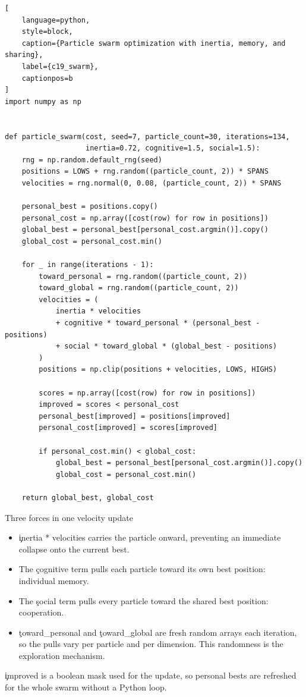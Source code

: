 \begin{lstlisting}[
    language=python,
    style=block,
    caption={Particle swarm optimization with inertia, memory, and sharing},
    label={c19_swarm},
    captionpos=b
]
import numpy as np


def particle_swarm(cost, seed=7, particle_count=30, iterations=134,
                   inertia=0.72, cognitive=1.5, social=1.5):
    rng = np.random.default_rng(seed)
    positions = LOWS + rng.random((particle_count, 2)) * SPANS
    velocities = rng.normal(0, 0.08, (particle_count, 2)) * SPANS

    personal_best = positions.copy()
    personal_cost = np.array([cost(row) for row in positions])
    global_best = personal_best[personal_cost.argmin()].copy()
    global_cost = personal_cost.min()

    for _ in range(iterations - 1):
        toward_personal = rng.random((particle_count, 2))
        toward_global = rng.random((particle_count, 2))
        velocities = (
            inertia * velocities
            + cognitive * toward_personal * (personal_best - positions)
            + social * toward_global * (global_best - positions)
        )
        positions = np.clip(positions + velocities, LOWS, HIGHS)

        scores = np.array([cost(row) for row in positions])
        improved = scores < personal_cost
        personal_best[improved] = positions[improved]
        personal_cost[improved] = scores[improved]

        if personal_cost.min() < global_cost:
            global_best = personal_best[personal_cost.argmin()].copy()
            global_cost = personal_cost.min()

    return global_best, global_cost
\end{lstlisting}

\begin{SyntaxBox}{Three forces in one velocity update}
\begin{itemize}
    \item \c{inertia * velocities} carries the particle onward, preventing an
          immediate collapse onto the current best.
    \item The \c{cognitive} term pulls each particle toward its own best
          position: individual memory.
    \item The \c{social} term pulls every particle toward the shared best
          position: cooperation.
    \item \c{toward_personal} and \c{toward_global} are fresh random arrays each
          iteration, so the pulls vary per particle and per dimension. This
          randomness is the exploration mechanism.
\end{itemize}
\c{improved} is a boolean mask used for the update, so personal bests are
refreshed for the whole swarm without a Python loop.
\end{SyntaxBox}

